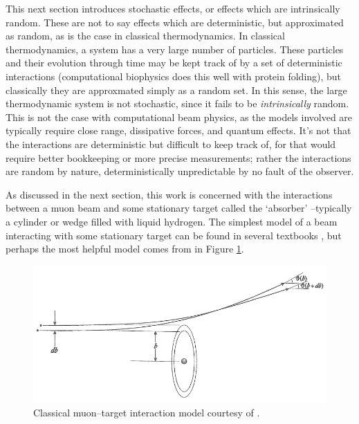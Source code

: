 \par

\par
This next section introduces stochastic effects, or effects which are intrinsically random. These are not to say effects which are deterministic, but approximated as random, as is the case in classical thermodynamics. In classical thermodynamics, a system has a very large number of particles. These particles and their evolution through time may be kept track of by a set of deterministic interactions (computational biophysics does this well with protein folding), but classically they are approxmated simply as a random set. In this sense, the large thermodynamic system is not stochastic, since it fails to be \emph{intrinsically} random. This is not the case with computational beam physics, as the models involved are typically require close range, dissipative forces, and quantum effects. It's not that the interactions are deterministic but difficult to keep track of, for that would require better bookkeeping or more precise measurements; rather the interactions are random by nature, deterministically unpredictable by no fault of the observer.

As discussed in the next section, this work is concerned with the interactions between a muon beam and some stationary target called the `absorber' --typically a cylinder or wedge filled with liquid hydrogen. The simplest model of a beam interacting with some stationary target can be found in several textbooks \cite{nielsen,griffithsqm}, but perhaps the most helpful model comes from \cite{jose} in Figure \ref{fig:scatteringmodel}.

\begin{figure}
  \centering
  \includegraphics[width=\textwidth]{Figures/scattering_model} 

  \caption{Classical muon--target interaction model courtesy of \cite{jose}.}
  \label{fig:scatteringmodel}
\end{figure}


